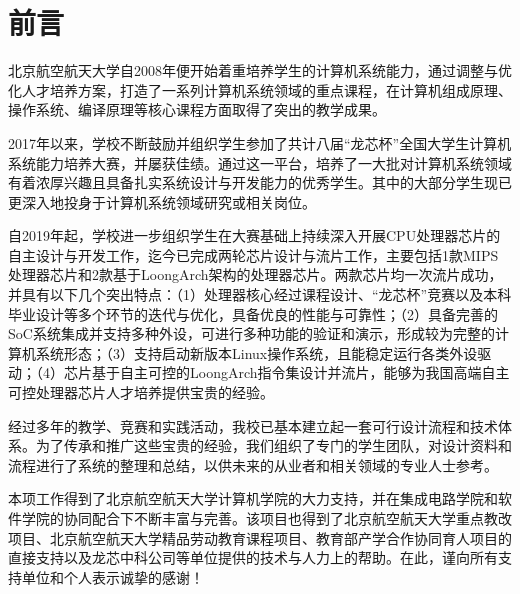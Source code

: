 
\chapter*{前言}\label{chap:00-preface}

北京航空航天大学自2008年便开始着重培养学生的计算机系统能力，通过调整与优化人才培养方案，打造了一系列计算机系统领域的重点课程，在计算机组成原理、操作系统、编译原理等核心课程方面取得了突出的教学成果。

2017年以来，学校不断鼓励并组织学生参加了共计八届``龙芯杯''全国大学生计算机系统能力培养大赛，并屡获佳绩。通过这一平台，培养了一大批对计算机系统领域有着浓厚兴趣且具备扎实系统设计与开发能力的优秀学生。其中的大部分学生现已更深入地投身于计算机系统领域研究或相关岗位。

自2019年起，学校进一步组织学生在大赛基础上持续深入开展CPU处理器芯片的自主设计与开发工作，迄今已完成两轮芯片设计与流片工作，主要包括1款MIPS处理器芯片和2款基于LoongArch架构的处理器芯片。两款芯片均一次流片成功，并具有以下几个突出特点：（1）处理器核心经过课程设计、``龙芯杯''竞赛以及本科毕业设计等多个环节的迭代与优化，具备优良的性能与可靠性；（2）具备完善的SoC系统集成并支持多种外设，可进行多种功能的验证和演示，形成较为完整的计算机系统形态；（3）支持启动新版本Linux操作系统，且能稳定运行各类外设驱动；（4）芯片基于自主可控的LoongArch指令集设计并流片，能够为我国高端自主可控处理器芯片人才培养提供宝贵的经验。

经过多年的教学、竞赛和实践活动，我校已基本建立起一套可行设计流程和技术体系。为了传承和推广这些宝贵的经验，我们组织了专门的学生团队，对设计资料和流程进行了系统的整理和总结，以供未来的从业者和相关领域的专业人士参考。

本项工作得到了北京航空航天大学计算机学院的大力支持，并在集成电路学院和软件学院的协同配合下不断丰富与完善。该项目也得到了北京航空航天大学重点教改项目、北京航空航天大学精品劳动教育课程项目、教育部产学合作协同育人项目的直接支持以及龙芯中科公司等单位提供的技术与人力上的帮助。在此，谨向所有支持单位和个人表示诚挚的感谢！
